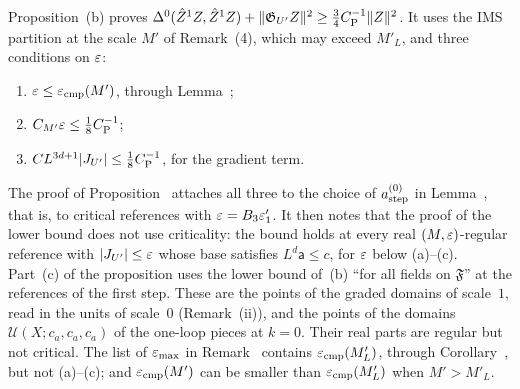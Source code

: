 \begin{detail}
\begin{step}[The first step, $k=0$]
Proposition~(b) proves $\Delta^0(\hat Z^1Z,\hat Z^1Z)+\|\mathfrak G_{U'}Z\|^2\ge\frac34C_{\rm P}^{-1}\|Z\|^2$. It uses the IMS partition at the scale $M'$ of Remark~(4), which may exceed $M'_L$, and three conditions on $\varepsilon$:
\begin{enumerate}[label=(\alph*)]
\item $\varepsilon\le\varepsilon_{\rm cmp}(M')$, through Lemma~;
\item $C_{M'}\varepsilon\le\frac18C_{\rm P}^{-1}$;
\item $CL^{3d+1}|J_{U'}|\le\frac18C_{\rm P}^{-1}$, for the gradient term.
\end{enumerate}
The proof of Proposition~ attaches all three to the choice of $a^{(0)}_{\rm step}$ in Lemma~, that is, to critical references with $\varepsilon=B_3\varepsilon'_1$. It then notes that the proof of the lower bound does not use criticality: the bound holds at every real $(M,\varepsilon)$-regular reference with $|J_{U'}|\le\varepsilon$ whose base satisfies $L^d\mathsf a\le c$, for $\varepsilon$ below (a)--(c). Part~(c) of the proposition uses the lower bound of~(b) ``for all fields on $\mathfrak F$'' at the references of the first step. These are the points of the graded domains of scale~$1$, read in the units of scale~$0$ (Remark~(ii)), and the points of the domains $\mathcal U(X;c_a,c_a,c_a)$ of the one-loop pieces at $k=0$. Their real parts are regular but not critical. The list of $\varepsilon_{\max}$ in Remark~ contains $\varepsilon_{\rm cmp}(M'_L)$, through Corollary~, but not (a)--(c); and $\varepsilon_{\rm cmp}(M')$ can be smaller than $\varepsilon_{\rm cmp}(M'_L)$ when $M'>M'_L$.
\end{step}


\end{detail}
